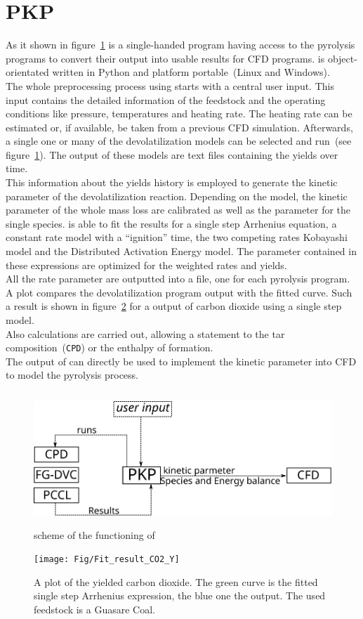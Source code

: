 \section{PKP}
As it shown in figure~\ref{F_scheme} \PKP is a single-handed program having access to the pyrolysis programs to convert their output into usable results for CFD programs. \PKP is object-orientated written in Python and platform portable~(Linux and Windows).\\
The whole preprocessing process using \PKP starts with a central user input. This input contains the detailed information of the feedstock and the operating conditions like pressure, temperatures and heating rate. The heating rate can be estimated or, if available, be taken from a previous CFD simulation. Afterwards, a single one or many of the devolatilization models can be selected and run~(see figure~\ref{F_scheme}). The output of these models are text files containing the yields over time.\\
This information about the yields history is employed to generate the kinetic parameter of the devolatilization reaction. Depending on the model, the kinetic parameter of the whole mass loss are calibrated as well as the parameter for the single species. \PKP is able to fit the results for a single step Arrhenius equation, a constant rate model with a ``ignition'' time, the two competing rates Kobayashi model and the Distributed Activation Energy model. The parameter contained in these expressions are optimized for the weighted  rates and yields.\\
All the rate parameter are outputted into a file, one for each pyrolysis program. A plot compares the devolatilization program output with the \PKP fitted curve. Such a result is shown in figure~\ref{F_FitWaterY} for a \CPD output of carbon dioxide using a single step model.\\
Also calculations are carried out, allowing a statement to the tar composition~(\texttt{CPD}) or the enthalpy of formation.\\
The output of \PKP can directly be used to implement the kinetic parameter into CFD to model the pyrolysis process.

\begin{figure}[h!]
\centering
\includegraphics[height=5cm,angle=0]{Fig/scheme}
\caption{scheme of the functioning of \PKP}
\label{F_scheme}
\end{figure}


\begin{figure}[h!]
\centering
\texttt{[image: Fig/Fit\_result\_CO2\_Y]}
\caption{A plot of the yielded carbon dioxide. The green curve is the fitted single step Arrhenius expression, the blue one the \CPD output. The used feedstock is a Guasare Coal.}
\label{F_FitWaterY}
\end{figure}